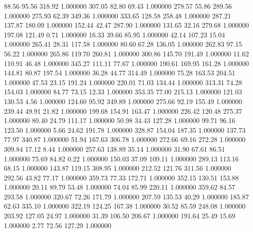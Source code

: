      88.56     95.56    318.92  1.000000
    307.05     82.80     69.43  1.000000
    278.57     55.86    289.56  1.000000
    275.93     62.39    349.36  1.000000
    333.65    128.58    258.48  1.000000
    287.21    137.87    180.09  1.000000
    152.44     42.47    287.90  1.000000
    131.65     32.16    279.68  1.000000
    197.08    121.49      0.71  1.000000
     16.33     39.66     85.95  1.000000
     42.14    107.23     15.04  1.000000
    265.41     28.31    117.58  1.000000
     80.60     67.28    136.05  1.000000
    262.83     97.15     56.22  1.000000
    265.86    119.70    260.81  1.000000
    300.86    145.70    191.49  1.000000
     11.62    110.91     46.48  1.000000
    345.27    111.11     77.67  1.000000
    190.61    169.95    161.28  1.000000
    144.81     80.87    197.54  1.000000
     36.28     44.77    314.49  1.000000
     75.28    163.53    204.51  1.000000
     47.53     23.15    191.24  1.000000
    220.01     71.03    134.44  1.000000
    313.31     74.28    154.03  1.000000
     84.77     73.15     12.33  1.000000
    353.35     77.00    215.13  1.000000
    121.03    130.53      4.56  1.000000
    124.60     95.92    349.89  1.000000
    275.66     92.19    155.49  1.000000
    239.44     49.91     21.82  1.000000
    199.68    154.91    163.47  1.000000
    226.42    120.48    275.37  1.000000
     80.40     24.79    111.17  1.000000
     50.98     34.43    127.28  1.000000
     99.71     96.16    123.50  1.000000
      5.66     24.62    191.78  1.000000
    328.87    154.04    187.35  1.000000
    137.73     77.97    340.87  1.000000
     51.94    167.63    306.78  1.000000
    272.66     69.16    272.28  1.000000
    309.84     17.12      8.44  1.000000
    257.63    138.89     35.14  1.000000
     31.90     67.61     86.51  1.000000
     75.69     84.82      0.22  1.000000
    150.03     37.09    109.11  1.000000
    289.13    113.16     68.15  1.000000
    143.87    119.15    308.95  1.000000
    212.52    121.76    311.56  1.000000
    292.56     43.82     77.17  1.000000
    359.73     77.33    172.71  1.000000
    352.15    130.51    153.88  1.000000
     20.11     89.79     53.48  1.000000
     74.04     85.99    220.11  1.000000
    359.62     84.57    293.58  1.000000
    320.67     72.26    171.79  1.000000
    207.59    135.53     40.29  1.000000
    185.87     62.63    335.10  1.000000
    322.19    124.25    167.38  1.000000
     30.52     85.59    248.08  1.000000
    203.92    127.05     24.97  1.000000
     31.39    106.50    206.67  1.000000
    191.64     25.49     15.69  1.000000
      2.77     72.56    127.29  1.000000
